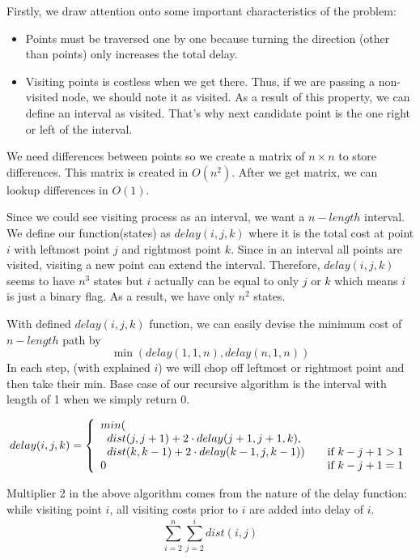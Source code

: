 Firstly, we draw attention onto some important characteristics of the problem:
\begin{itemize}
  \item Points must be traversed one by one because turning the direction (other than points) only increases the total delay.
  \item Visiting points is costless when we get there. Thus, if we are passing a non-visited node, we should note it as visited. As a result of this property, we can define an interval as visited. That's why next candidate point is the one right or left of the interval. 
\end{itemize}

We need differences between points so we create a matrix of $n \times n$ to store differences. This matrix is created in $O(n^2)$. After we get matrix, we can lookup differences in $O(1)$.

Since we could see visiting process as an interval, we want a $n-length$ interval. We define our function(states) as $delay(i, j, k)$ where it is the total cost at point $i$ with leftmost point $j$ and rightmost point $k$. Since in an interval all points are visited, visiting a new point can extend the interval. Therefore, $delay(i, j, k)$ seems to have $n^3$ states but $i$ actually can be equal to only $j$ or $k$ which means $i$ is just a binary flag. As a result, we have only $n^2$ states.

With defined $delay(i, j, k)$ function, we can easily devise the minimum cost of $n-length$ path by
$$
  \min(delay(1, 1, n), delay(n, 1, n))
$$ 
In each step, (with explained $i$) we will chop off  leftmost or rightmost point and then take their min. Base case of our recursive algorithm is the interval with length of 1 when we simply return 0.

$$delay(i, j, k) = \left\{ 
  \begin{array}{l l}
    min( \\ \hspace{.2cm} dist(j, j+1) + 2 \cdot delay(j+1, j+1, k), \\ \hspace{.2cm} dist(k, k-1) + 2 \cdot delay(k-1, j, k-1)) & \quad \text{if } k-j+1 > 1 \\
    0 & \quad \text{if } k-j+1 = 1
  \end{array} \right.
$$

Multiplier 2 in the above algorithm comes from the nature of the delay function: while visiting point $i$, all visiting costs prior to $i$ are added into delay of $i$.
$$
  \sum_{i=2}^{n}{\sum_{j=2}^{i}{dist(i, j)}}
$$

